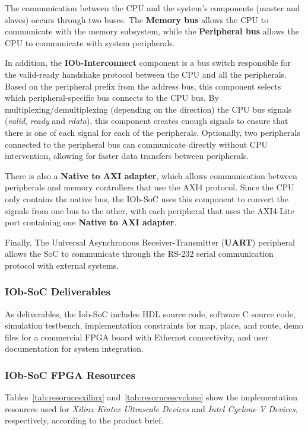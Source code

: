 The communication between the CPU and the system’s components (master and slaves) occurs through two buses. The \textbf{Memory bus} allows the CPU to communicate with the memory subsystem, while the \textbf{Peripheral bus} allows the CPU to communicate with system peripherals.

In addition, the \textbf{IOb-Interconnect} component is a bus switch responsible for the valid-ready handshake protocol between the CPU and all the peripherals. 
Based on the peripheral prefix from the address bus, this component selects which peripheral-specific bus connects to the CPU bus. By multiplexing/demultiplexing (depending on the direction) the CPU bus signals (\textit{valid}, \textit{ready} and \textit{rdata}), this component creates enough signals to ensure that there is one of each signal for each of the peripherals. Optionally, two peripherals connected to the peripheral bus can communicate directly without CPU intervention, allowing for faster data transfers between peripherals.

There is also a \textbf{Native to AXI adapter}, which allows communication between peripherals and memory controllers that use the AXI4 protocol. Since the CPU only contains the native bus, the IOb-SoC uses this component to convert the signals from one bus to the other, with each peripheral that uses the AXI4-Lite port containing one \textbf{Native to AXI adapter}.

Finally, The Universal Asynchronous Receiver-Transmitter (\textbf{\textbf{UART}}) peripheral allows the SoC to communicate through the RS-232 serial communication protocol with external systems. 

\subsubsection{IOb-SoC Deliverables}
As deliverables, the Iob-SoC includes HDL source code, software C source code, simulation testbench, implementation constraints for map, place, and route, demo files for a commercial FPGA board with Ethernet connectivity, and user documentation for system integration.

\subsubsection{IOb-SoC FPGA Resources}
Tables~\ref{tab:resorucesxilinx} and~\ref{tab:resorucescyclone} show the implementation resources used for \textit{Xilinx Kintex Ultrascale Devices} and \textit{Intel Cyclone V Devices}, respectively, according to the product brief.

